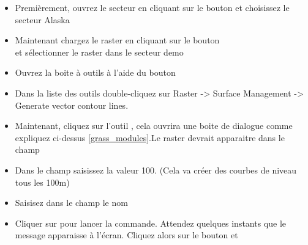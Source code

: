 \begin{itemize}[label=--]
\item Premièrement, ouvrez le secteur en cliquant sur le bouton  et choisissez le secteur Alaska
\item Maintenant chargez le raster en cliquant sur le bouton\\  et sélectionner le raster  dans le secteur demo
\item Ouvrez la boite à outils à l'aide du bouton 
\item Dans la liste des outils double-cliquez sur Raster -> Surface Management -> Generate vector contour lines.
\item Maintenant, cliquez sur l'outil , cela ouvrira une boite de dialogue comme expliquez ci-dessus \ref{grass_modules}.Le raster  devrait apparaitre dans le champ\\ 
\item Dans le champ  saisissez la valeur 100. (Cela va créer des courbes de niveau tous les 100m)
\item Saisisez dans le champ  le nom 
\item Cliquer sur  pour lancer la commande. Attendez quelques instants que le message  apparaisse à l'écran.
Cliquez alors sur le bouton  et 
\end{itemize}

